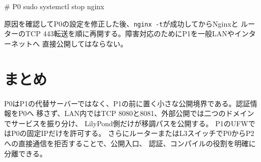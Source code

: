 \documentclass[uplatex,a4paper,11pt]{jsarticle}
\begin{document}
\begin{command}
# P0
sudo systemctl stop nginx
\end{command}

原因を確認してP0の設定を修正した後、\texttt{nginx -t}が成功してからNginxと
ルーターのTCP 443転送を順に再開する。障害対応のためにP1を一般LANやインターネットへ
直接公開してはならない。

\section{まとめ}

P0はP1の代替サーバーではなく、P1の前に置く小さな公開境界である。認証情報をP0へ
移さず、LAN内ではTCP 8080と8081、外部公開では二つのドメインでサービスを振り分け、
LilyPond側だけが移調パスを公開する。
P1のUFWではP0の固定IPだけを許可する。
さらにルーターまたはL3スイッチでP0からP2への直接通信を拒否することで、公開入口、
認証、コンパイルの役割を明確に分離できる。
\end{document}
